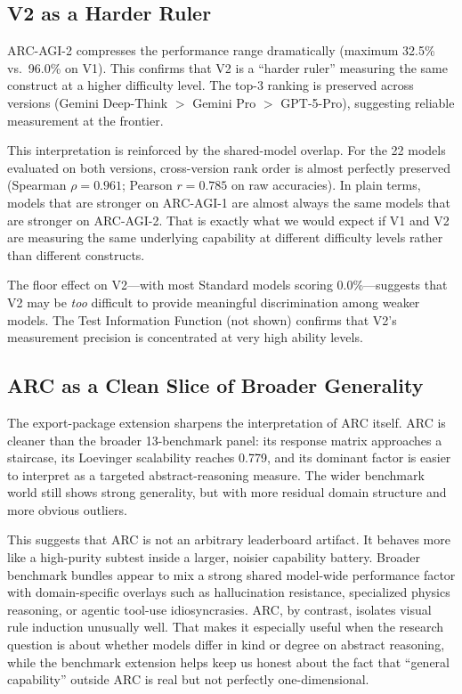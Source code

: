 \documentclass[11pt, letterpaper]{article}
\begin{document}
\subsection{V2 as a Harder Ruler}

ARC-AGI-2 compresses the performance range dramatically (maximum 32.5\% vs.\ 96.0\% on V1). This confirms that V2 is a ``harder ruler'' measuring the same construct at a higher difficulty level. The top-3 ranking is preserved across versions (Gemini Deep-Think $>$ Gemini Pro $>$ GPT-5-Pro), suggesting reliable measurement at the frontier.

This interpretation is reinforced by the shared-model overlap. For the 22 models evaluated on both versions, cross-version rank order is almost perfectly preserved (Spearman $\rho = 0.961$; Pearson $r = 0.785$ on raw accuracies). In plain terms, models that are stronger on ARC-AGI-1 are almost always the same models that are stronger on ARC-AGI-2. That is exactly what we would expect if V1 and V2 are measuring the same underlying capability at different difficulty levels rather than different constructs.

The floor effect on V2---with most Standard models scoring 0.0\%---suggests that V2 may be \textit{too} difficult to provide meaningful discrimination among weaker models. The Test Information Function (not shown) confirms that V2's measurement precision is concentrated at very high ability levels.

\subsection{ARC as a Clean Slice of Broader Generality}

The export-package extension sharpens the interpretation of ARC itself. ARC is cleaner than the broader 13-benchmark panel: its response matrix approaches a staircase, its Loevinger scalability reaches 0.779, and its dominant factor is easier to interpret as a targeted abstract-reasoning measure. The wider benchmark world still shows strong generality, but with more residual domain structure and more obvious outliers.

This suggests that ARC is not an arbitrary leaderboard artifact. It behaves more like a high-purity subtest inside a larger, noisier capability battery. Broader benchmark bundles appear to mix a strong shared model-wide performance factor with domain-specific overlays such as hallucination resistance, specialized physics reasoning, or agentic tool-use idiosyncrasies. ARC, by contrast, isolates visual rule induction unusually well. That makes it especially useful when the research question is about whether models differ in kind or degree on abstract reasoning, while the benchmark extension helps keep us honest about the fact that ``general capability'' outside ARC is real but not perfectly one-dimensional.
\end{document}
